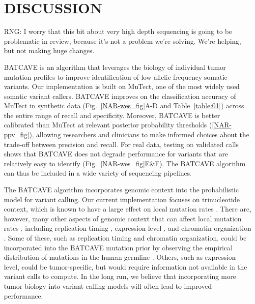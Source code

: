 \documentclass[a4,center,fleqn]{NAR}
\newcommand{\rngcomment}[1]{{\color{red}RNG: #1}}
\newcommand{\batcave}{BATCAVE }
\begin{document}
\section{DISCUSSION}
 
\rngcomment{I worry that this bit about very high depth sequencing is going to be problematic in review, because it's not a problem we're solving. We're helping, but not making huge changes.}

\batcave is an algorithm that leverages the biology of individual tumor mutation profiles to improve identification of low allelic frequency somatic variants.
Our implementation is built on MuTect, one of the most widely used somatic variant callers.
\batcave improves on the classification accuracy of MuTect in synthetic data (Fig.~\ref{NAR-wes_fig}A-D and Table~\ref{table:01}) across the entire range of recall and specificity.
Moreover, \batcave is better calibrated than MuTect at relevant posterior probability thresholds (\ref{NAR-ppv_fig}), allowing researchers and clinicians to make informed choices about the trade-off between precision and recall.
For real data, testing on validated calls shows that \batcave does not degrade performance for variants that are relatively easy to identify (Fig.~\ref{NAR-wes_fig}E\&F).
The \batcave algorithm can thus be included in a wide variety of sequencing pipelines.

The \batcave algorithm incorporates genomic context into the probabilistic model for variant calling.
Our current implementation focuses on trinucleotide context, which is known to have a large effect on local mutation rates \cite{Martincorena2015,Hollstein2017}.
There are, however, many other aspects of genomic context that can affect local mutation rates \citep{Buisson2019}, including replication timing \citep{Stamatoyannopoulos2009}, expression level \citep{Pleasance2010}, and chromatin organization \citep{Schuster-Bockler2012}. 
Some of these, such as replication timing and chromatin organization, could be incorporated into the \batcave mutation prior by observing the empirical distribution of mutations in the human germline \cite{Hodgkinson2011}.
Others, such as expression level, could be tumor-specific, but would require information not available in the variant calls to compute.
In the long run, we believe that incorporating more tumor biology into variant calling models will often lead to improved performance.
\end{document}
